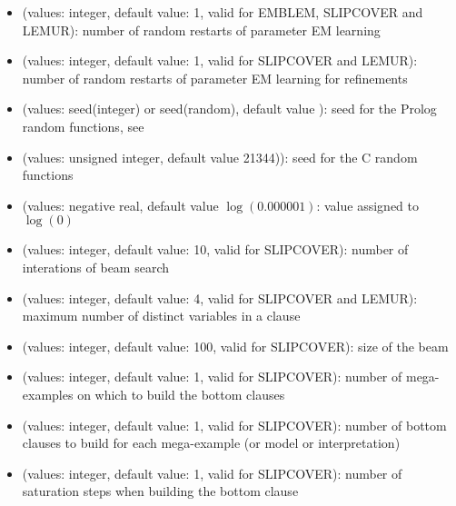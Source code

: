 \documentclass[letterpaper,10pt,english]{sphinxmanual}
\begin{document}
\begin{itemize}
\item {} 
 (values: integer, default value: 1, valid for EMBLEM, SLIPCOVER and LEMUR): number of random restarts of parameter EM learning

\item {} 
 (values: integer, default value: 1, valid for SLIPCOVER and LEMUR): number of random restarts of parameter EM learning for refinements

\item {} 
 (values: seed(integer) or seed(random), default value ): seed for the Prolog random functions, see 

\item {} 
 (values: unsigned integer, default value 21344)): seed for the C random functions

\item {} 
 (values: negative real, default value \(\log(0.000001)\): value assigned to \(\log(0)\)

\item {} 
 (values: integer, default value: 10, valid for SLIPCOVER): number of interations of beam search

\item {} 
 (values: integer, default value: 4, valid for SLIPCOVER and LEMUR): maximum number of distinct variables in a clause

\item {} 
 (values: integer, default value: 100, valid for SLIPCOVER): size of the beam

\item {} 
 (values: integer, default value: 1, valid for SLIPCOVER): number of mega-examples on which to build the bottom clauses

\item {} 
 (values: integer, default value: 1, valid for SLIPCOVER): number of bottom clauses to build for each mega-example (or model or interpretation)

\item {} 
 (values: integer, default value: 1, valid for SLIPCOVER): number of saturation steps when building the bottom clause


\end{itemize}
\end{document}
